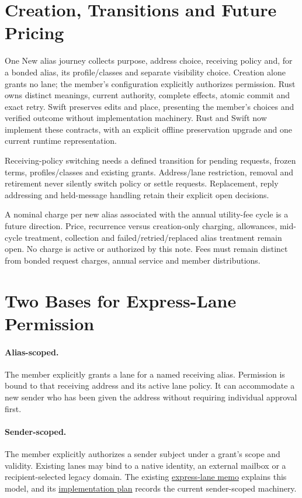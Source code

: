 \documentclass[11pt]{article}
\begin{document}
\section{Creation, Transitions and Future Pricing}

One New alias journey collects purpose, address choice, receiving policy and,
for a bonded alias, its profile/classes and separate visibility choice. Creation
alone grants no lane; the member's configuration explicitly authorizes permission.
Rust owns distinct meanings, current authority, complete effects, atomic commit
and exact retry. Swift preserves edits and place, presenting the member's choices
and verified outcome without implementation machinery. Rust and Swift now implement
these contracts, with an explicit offline preservation upgrade and one current
runtime representation.

Receiving-policy switching needs a defined transition for pending requests,
frozen terms, profiles/classes and existing grants. Address/lane restriction,
removal and retirement never silently switch policy or settle requests. Replacement,
reply addressing and held-message handling retain their explicit open decisions.

A nominal charge per new alias associated with the annual utility-fee cycle is a
future direction. Price, recurrence versus creation-only charging, allowances,
mid-cycle treatment, collection and failed/retried/replaced alias treatment remain
open. No charge is active or authorized by this note. Fees must remain distinct
from bonded request charges, annual service and member distributions.


\section{Two Bases for Express-Lane Permission}

\paragraph{Alias-scoped.}
The member explicitly grants a lane for a named receiving alias. Permission is bound
to that receiving address and its active lane policy. It can accommodate a new
sender who has been given the address without requiring individual approval first.

\paragraph{Sender-scoped.}
The member explicitly authorizes a sender subject under a grant's scope and
validity. Existing lanes may bind to a native identity, an external mailbox or a
recipient-selected legacy domain. The existing
\href{cs_mail_express_lanes.tex}{express-lane memo} explains this model, and its
\href{cs_mail_express_lanes_implementation.tex}{implementation plan} records the
current sender-scoped machinery.
\end{document}
